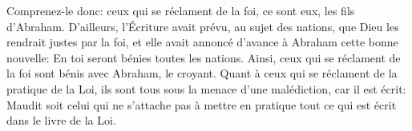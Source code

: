 Comprenez-le donc: ceux qui se réclament de la foi, ce sont eux, les fils d’Abraham.
D’ailleurs, l’Écriture avait prévu, au sujet des nations,
	que Dieu les rendrait justes par la foi,
	et elle avait annoncé d’avance à Abraham cette bonne nouvelle:
	En toi seront bénies toutes les nations.
Ainsi, ceux qui se réclament de la foi sont bénis avec Abraham, le croyant.
Quant à ceux qui se réclament de la pratique de la Loi,
	ils sont tous sous la menace d’une malédiction, car il est écrit:
	Maudit soit celui qui ne s’attache pas à mettre en pratique
		tout ce qui est écrit dans le livre de la Loi.
